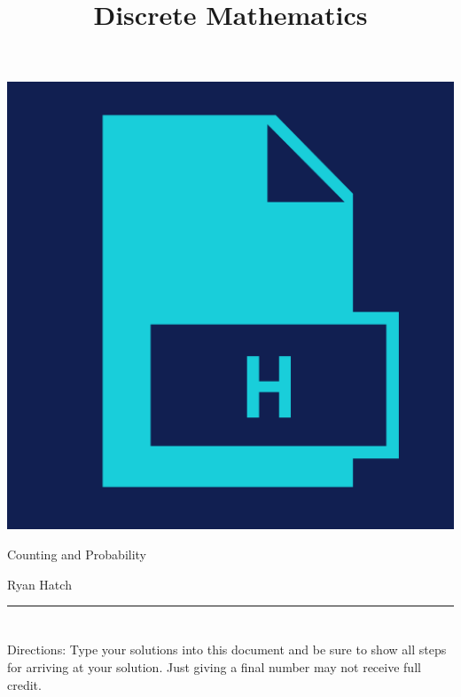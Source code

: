 \documentclass{amsart}
\theoremstyle{definition}
\theoremstyle{Exercise}
\theoremstyle{remark}
\theoremstyle{rule}
\numberwithin{equation}{section}
\begin{document}
\begin{center}
\includegraphics[scale=.1]{logo.png}
\end{center}
\title{\sf Discrete Mathematics}%


\maketitle
Counting and Probability
\begin{center}
Ryan Hatch
\end{center}


\begin{center}
\rule{\textwidth}{0.4pt}
\end{center}


\newpage
\section*{}
\section*{}
Directions: Type your solutions into this document and be sure to show all steps for arriving at your solution. Just giving a final number may not receive full credit.
\\\\
\end{document}
